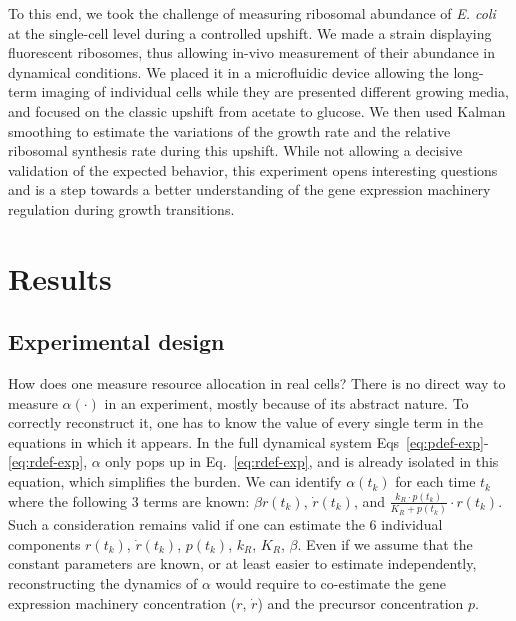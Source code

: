 To this end, we took the challenge of measuring ribosomal abundance of \textit{E. coli} at the single-cell level during a controlled upshift.
We made a strain displaying fluorescent ribosomes, thus allowing in-vivo measurement of their abundance in dynamical conditions.
We placed it in a microfluidic device allowing the long-term imaging of individual cells while they are presented different growing media, and focused on the classic upshift from acetate to glucose.
We then used Kalman smoothing to estimate the variations of the growth rate and the relative ribosomal synthesis rate during this upshift.
While not allowing a decisive validation of the expected behavior, this experiment opens interesting questions and is a step towards a better understanding of the gene expression machinery regulation during growth transitions.

\section{Results}

\subsection{Experimental design}
\label{sec:exp_design}

How does one measure resource allocation in real cells?
There is no direct way to measure $\alpha (\cdot)$ in an experiment, mostly because of its abstract nature.
To correctly reconstruct it, one has to know the value of every single term in the equations in which it appears.
In the full dynamical system Eqs~\ref{eq:pdef-exp}-\ref{eq:rdef-exp}, $\alpha$ only pops up in Eq.~\ref{eq:rdef-exp}, and is already isolated in this equation, which simplifies the burden.
We can identify $\alpha (t_k)$ for each time $t_k$ where the following 3 terms are known: $\beta r(t_k)$, $\dot{r}(t_k)$, and $\frac{k_R \cdot p(t_k)}{K_R + p(t_k)} \cdot r(t_k)$.
Such a consideration remains valid if one can estimate the 6 individual components $r(t_k)$, $\dot{r}(t_k)$, $p(t_k)$, $k_R$, $K_R$, $\beta$.
Even if we assume that the constant parameters are known, or at least easier to estimate independently, reconstructing the dynamics of $\alpha$ would require to co-estimate the gene expression machinery concentration ($r$, $\dot{r}$) and the precursor concentration $p$.

